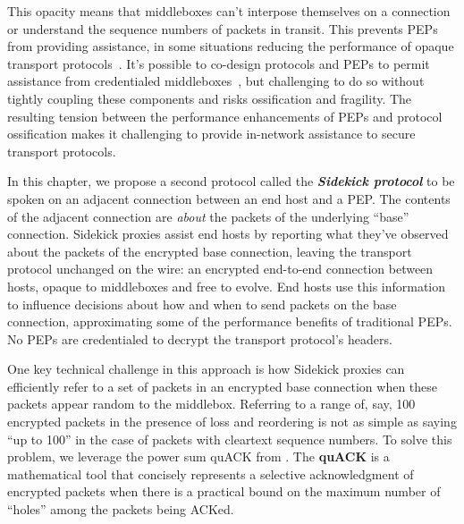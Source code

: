 This opacity means that middleboxes can't interpose themselves on a
connection or understand the sequence numbers of packets in transit. This
prevents PEPs from providing assistance, in some situations reducing the
performance of opaque transport protocols~\cite
{border2020quicsat-presentation,kuhn2021quic-over-sat,martin2022suitability,border2020evaluating,kosek2022quicpep}.
It's possible to co-design protocols and PEPs to permit assistance from
credentialed middleboxes~\cite{ford2008logjam,sherry2015blindbox, dogar2012tapa,iyengar2009flow},
but challenging to do so without tightly coupling these components and risks
ossification and fragility. The resulting tension between the performance
enhancements of PEPs and protocol ossification makes it challenging to provide
in-network assistance to secure transport protocols.

In this chapter, we propose a
second protocol called the \emph{\bf Sidekick protocol} to be spoken on an
adjacent connection between an end host and a PEP. The contents of the adjacent
connection are \emph{about} the packets of the underlying ``base'' connection.
Sidekick proxies assist end hosts by reporting what they've observed about the
packets of the encrypted base connection, leaving the transport protocol
unchanged on the wire: an encrypted end-to-end connection between hosts, opaque
to middleboxes and free to evolve. End hosts use this information to influence
decisions about how and when to send packets on the base connection,
approximating some of the performance benefits of traditional PEPs.
No PEPs are credentialed to decrypt the transport protocol's headers.


One key technical challenge in this approach is how Sidekick proxies can
efficiently refer to a set of packets in an encrypted base connection when
these packets appear random to the middlebox. Referring to a range of, say, 100
encrypted packets in the presence of loss and reordering is not as simple as
saying ``up to 100'' in the case of packets with cleartext sequence numbers. To
solve this problem, we leverage the power sum quACK from . The
{\bf quACK} is a mathematical tool that concisely represents a selective
acknowledgment of encrypted packets when there is a practical bound on the
maximum number of ``holes'' among the packets being ACKed.

